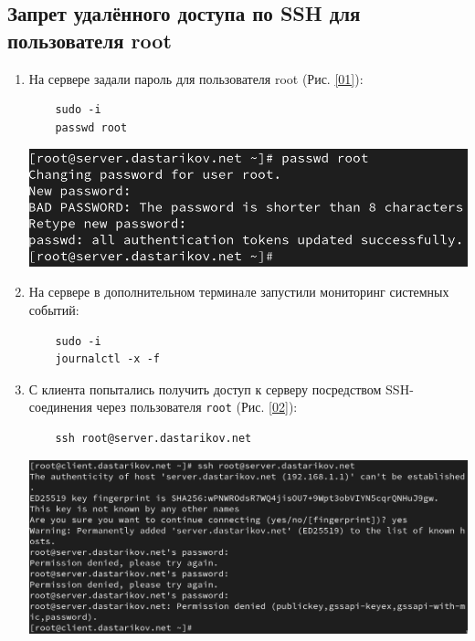 \subsection{Запрет удалённого доступа по SSH для пользователя root}
\begin{enumerate}
\item На сервере задали пароль для пользователя root (Рис. \ref{01}):
  \begin{verbatim}
    sudo -i
    passwd root
  \end{verbatim}
\begin{center}
  \centering
  \includegraphics[width=\textwidth]{../images/image01.png}
  \label{01}
\end{center}

\item На сервере в дополнительном терминале запустили мониторинг системных событий:
  \begin{verbatim}
    sudo -i
    journalctl -x -f
  \end{verbatim}
\item С клиента попытались получить доступ к серверу посредством SSH-соединения через пользователя \texttt{root} (Рис. \ref{02}):
  \begin{verbatim}
    ssh root@server.dastarikov.net
  \end{verbatim}
\begin{center}
  \centering
  \includegraphics[width=\textwidth]{../images/image02.png}
  \label{02}
\end{center}


\end{enumerate}
